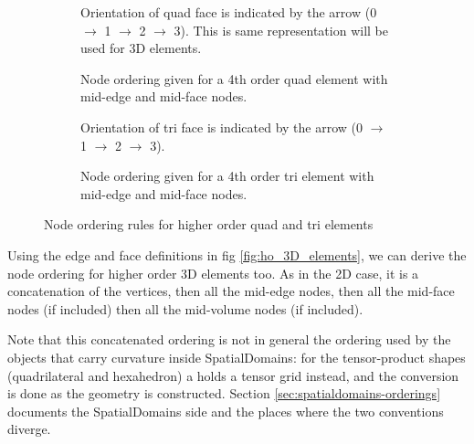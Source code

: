 {\begin{figure}[h!]
    \centering
    \begin{subfigure}[b]{0.45\textwidth}
        \centering
        
        \caption{Orientation of quad face is indicated by the arrow (0 $\rightarrow$ 1 $\rightarrow$ 2 $\rightarrow$ 3). This is same representation will be used for 3D elements.}
        \label{fig:ho_quad-arrow}
    \end{subfigure}
    \hfill
    \begin{subfigure}[b]{0.45\textwidth}
        \centering
        
        \caption{Node ordering given for a 4th order quad element with mid-edge and mid-face nodes.}
        \label{fig:ho_quad-numbered}
    \end{subfigure}
    \begin{subfigure}[b]{0.45\textwidth}
        \centering
        
        \caption{Orientation of tri face is indicated by the arrow (0 $\rightarrow$ 1 $\rightarrow$ 2 $\rightarrow$ 3).}
        \label{fig:ho_tri-arrow}
    \end{subfigure}
    \hfill
    \begin{subfigure}[b]{0.45\textwidth}
        \centering
        
        \caption{Node ordering given for a 4th order tri element with mid-edge and mid-face nodes.}
        \label{fig:ho_tri-numbered}
    \end{subfigure}
    \caption{Node ordering rules for higher order quad and tri elements}
    \label{fig:ho_2D_elements}
\end{figure}

Using the edge and face definitions in fig \ref{fig:ho_3D_elements},
we can derive the node ordering for higher order 3D elements too. As
in the 2D case, it is a concatenation of the vertices, then all the
mid-edge nodes, then all the mid-face nodes (if included) then all the
mid-volume nodes (if included).

Note that this concatenated ordering is not in general the ordering used by
the  objects that carry curvature inside SpatialDomains: for the
tensor-product shapes (quadrilateral and hexahedron) a  holds a
tensor grid instead, and the conversion is done as the geometry is
constructed.  Section \ref{sec:spatialdomains-orderings} documents the
SpatialDomains side and the places where the two conventions diverge.

}
